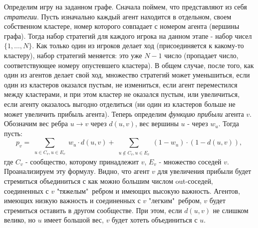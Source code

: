 Определим игру на заданном графе. Сначала поймем, что представляют из себя \textit{стратегии}. Пусть изначально каждый агент находится в отдельном, своем собственном кластере, номер которого совпадает с номером агента (вершины графа). Тогда набор стратегий для каждого игрока на данном этапе - набор чисел $\{1,\dots,N\}$. Как только один из игроков делает ход (присоединяется к какому-то кластеру), набор стратегий меняется: это уже $N-1$ число (пропадает число, соответствующее номеру опустевшего кластера). В общем случае, после того, как один из агентов делает свой ход, множество стратегий может уменьшиться, если один из кластеров оказался пустым, не измениться, если агент переместился между кластерами, и при этом кластер не оказался пустым, или увеличиться, если агенту оказалось выгодно отделиться (ни один из кластеров больше не может увеличить прибыль агента). Теперь определим \textit{функцию прибыли} агента $v$. Обозначим вес ребра $u\rightarrow v$ через $d(u, v)$, вес вершины $u$ - через $w_u$. Тогда пусть:
\begin{equation}
p_v = \sum_{\substack{u\in{C_v}, u\in{E_v}}} w_u\cdot d(u, v) + \sum_{\substack{u\notin{C_v}, u\in{E_v}}} (1-w_u)\cdot(1-d(u, v)),
\end{equation}
где $C_v$ - сообщество, которому принадлежит $v$, $E_v$ - множество соседей $v$. Проанализируем эту формулу. Видно, что агент $v$ для увеличения прибыли будет стремиться объединиться с как можно большим числом out-соседей, соединенных с $v$ "тяжелым"\ ребром и имеющих высокую важность. Агентов, имеющих низкую важность и соединенных с $v$ "легким"\ ребром, $v$ будет стремиться оставить в другом сообществе. При этом, если $d(u, v)$ не слишком велико, но $u$ имеет большой вес, $v$ будет хотеть объединиться с $u$.  \\

